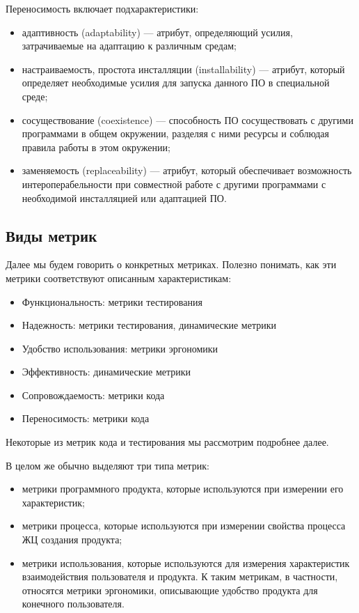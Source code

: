 \documentclass{../../text-style}
\begin{document}
Переносимость включает подхарактеристики:

\begin{itemize}
    \item адаптивность (adaptability) --- атрибут, определяющий усилия, затрачиваемые на адаптацию к различным средам;
    \item настраиваемость, простота инсталляции (installability) --- атрибут, который определяет необходимые усилия для запуска данного ПО в специальной среде;
    \item сосуществование (coexistence) --- способность ПО сосуществовать с другими программами в общем окружении, разделяя с ними ресурсы и соблюдая правила работы в этом окружении;
    \item заменяемость (replaceability) --- атрибут, который обеспечивает возможность интероперабельности при совместной работе с другими программами с необходимой инсталляцией или адаптацией ПО.
\end{itemize}

\subsection{Виды метрик}


Далее мы будем говорить о конкретных метриках. Полезно понимать, как эти метрики соответствуют описанным характеристикам:

\begin{itemize}
    \item Функциональность: метрики тестирования
    \item Надежность: метрики тестирования, динамические метрики
    \item Удобство использования: метрики эргономики
    \item Эффективность: динамические метрики
    \item Сопровождаемость: метрики кода
    \item Переносимость: метрики кода
\end{itemize}

Некоторые из метрик кода и тестирования мы рассмотрим подробнее далее.

В целом же обычно выделяют три типа метрик:

\begin{itemize}
    \item метрики программного продукта, которые используются при измерении его характеристик;
    \item метрики процесса, которые используются при измерении свойства процесса ЖЦ создания продукта;
    \item метрики использования, которые используются для измерения характеристик взаимодействия пользователя и продукта. К таким метрикам, в частности, относятся метрики эргономики, описывающие удобство продукта для конечного пользователя.
\end{itemize}
\end{document}
